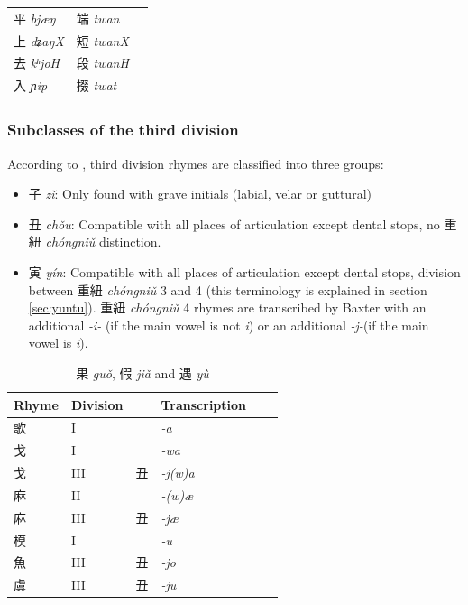 \documentclass[oneside,a4paper,11pt]{article}
\newcommand{\ipa}[1]{{\phon\textit{#1}}}
\newcommand{\zh}[1]{{\cn #1}}
\newcommand{\zhc}[2]{\zh{#1} \ipa{#2}}
\begin{document}
\begin{tabular}{lll} 
\zhc{平}{bjæŋ} & \zhc{端}{twan} \\
\zhc{上}{dʑaŋX} & \zhc{短}{twanX} \\
\zhc{去}{kʰjoH} & \zhc{段}{twanH} \\
\zhc{入}{ɲip} & \zhc{掇}{twat} \\
\end{tabular}

\subsubsection{Subclasses of the third division} \label{sec:third}

According to \citet{lirong56qy}, third division rhymes are classified into three groups:

\begin{itemize}
\item \zhc{子}{zǐ}: Only found with grave initials (labial, velar or guttural)
\item \zhc{丑}{chǒu}: Compatible with all places of articulation except dental stops, no \zhc{重紐}{chóngniǔ} distinction.
\item \zhc{寅}{yín}: Compatible with all places of articulation except dental stops, division between \zhc{重紐}{chóngniǔ} 3 and 4 (this terminology is explained in section \ref{sec:yuntu}). \zhc{重紐}{chóngniǔ} 4 rhymes are transcribed by Baxter with an additional \ipa{-i-} (if the main vowel is not \ipa{i}) or an additional \ipa{-j-}(if the main vowel is \ipa{i}).
\end{itemize} 

\begin{table}[H]
\caption{\zhc{果}{guǒ}, \zhc{假}{jiǎ} and \zhc{遇}{yù}} \centering \label{tab:guo}
\begin{tabular}{llllll}
\toprule
Rhyme & Division & & Transcription \\
\midrule
\zh{歌} &	I &	&	\ipa{-a} &	\\
\zh{戈} &	I &	&	\ipa{-wa} &	\\
\zh{戈} &	III &	\zh{丑} &	\ipa{-j(w)a} &	\\
\midrule
\zh{麻} &	II &	&	\ipa{-(w)æ} &	\\
\zh{麻} &	III &	\zh{丑} &	\ipa{-jæ} &	\\
\midrule
\zh{模} &	I &	&	\ipa{-u} &	\\
\zh{魚} &	III &	\zh{丑} &	\ipa{-jo} &	\\
\zh{虞} &	III &	\zh{丑} &	\ipa{-ju} &	\\
\bottomrule
\end{tabular}
\end{table}
\end{document}
